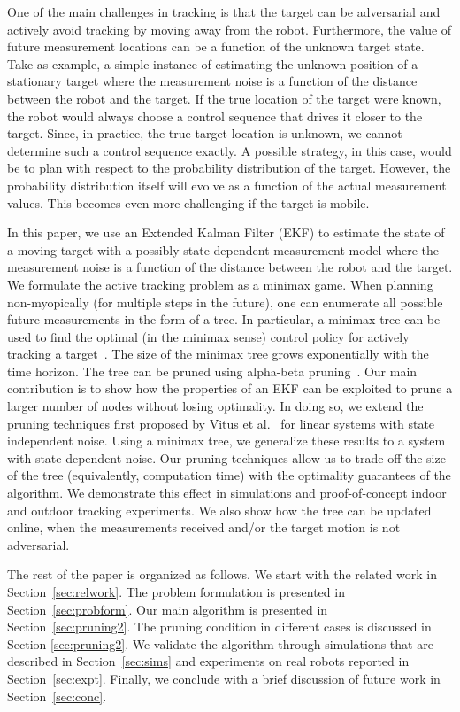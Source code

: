 \documentclass[journal]{IEEEtran}
\begin{document}
One of the main challenges in tracking is that the target can be adversarial and actively  avoid tracking by moving away from the robot. Furthermore, the value of future measurement locations can be a function of the unknown target state. Take as example, a simple instance of estimating the unknown position of a stationary target where the measurement noise is a function of the distance between the robot and the target. If the true location of the target were known, the robot would always choose a control sequence that drives it closer to the target. Since, in practice, the true target location is unknown, we cannot determine such a control sequence exactly. A possible strategy, in this case, would be to plan with respect to the probability distribution of the target. However, the probability distribution itself will evolve as a function of the actual measurement values. This becomes even more challenging if the target is mobile. 

In this paper, we use an Extended Kalman Filter (EKF) to estimate the state of a moving target with a possibly state-dependent measurement model where the measurement noise is a function of the distance between the robot and the target. We formulate the active tracking problem as a minimax game.  When planning non-myopically (for multiple steps in the future), one can enumerate all possible future measurements in the form of a tree. In particular, a minimax tree can be used to find the optimal (in the minimax sense) control policy for actively tracking a target~\cite{tokekar2011active}. The size of the minimax tree grows exponentially with the time horizon. The tree can be pruned using alpha-beta pruning~\cite{russell2009artificial}. Our main contribution is to show how the properties of an EKF can be exploited to prune a larger number of nodes without losing optimality. In doing so, we extend the pruning techniques first proposed by Vitus et al.~\cite{vitus2012efficient} for linear systems with state independent noise. Using a minimax tree, we generalize these results to a system with state-dependent noise. Our pruning techniques allow us to trade-off the size of the tree (equivalently, computation time) with the optimality guarantees of the algorithm. We demonstrate this effect in simulations and proof-of-concept indoor and outdoor tracking experiments. We also show how the tree can be updated online, when the measurements received and/or the target motion is not adversarial.

The rest of the paper is organized as follows. We start with the related work in Section~\ref{sec:relwork}. The problem formulation is presented in Section~\ref{sec:probform}. Our main algorithm is presented in Section~\ref{sec:pruning2}. The pruning condition in different cases is discussed in Section \ref{sec:pruning2}. We validate the algorithm through simulations that are described in Section~\ref{sec:sims} and experiments on real robots reported in Section~\ref{sec:expt}. Finally, we conclude with a brief discussion of future work in Section~\ref{sec:conc}. 
\end{document}
